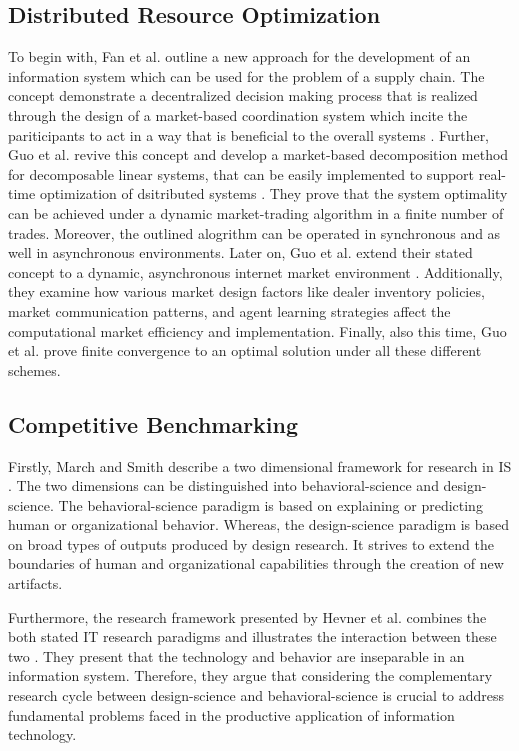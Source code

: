 \subsection{Distributed Resource Optimization}
\label{sec:Distributed Resource Optimization}
To begin with, Fan et al. outline a new approach for the development of an information system which can be used for the problem of a supply chain. The concept demonstrate a decentralized decision making process that is realized through the design of a market-based coordination system which incite the pariticipants to act in a way that is beneficial to the overall systems \cite{fan2003decentralized}. Further, Guo et al. revive this concept and develop a market-based decomposition method for decomposable linear systems, that can be easily implemented to support real-time optimization of dsitributed systems \cite{guo2007market}. They prove that the system optimality can be achieved under a dynamic market-trading algorithm in a finite number of trades. Moreover, the outlined alogrithm can be operated in synchronous and as well in asynchronous environments. Later on, Guo et al. extend their stated concept to a dynamic, asynchronous internet market environment \cite{guo2012computational}. Additionally, they examine how various market design factors like dealer inventory policies, market communication patterns, and agent learning strategies affect the computational market efficiency and implementation. Finally, also this time, Guo et al. prove finite convergence to an optimal solution under all these different schemes. 

\subsection{Competitive Benchmarking}
Firstly, March and Smith describe a two dimensional framework for research in IS \cite{march1995design}. The two dimensions can be distinguished into behavioral-science and design-science. The behavioral-science paradigm is based on explaining or predicting human or organizational behavior. Whereas, the design-science paradigm is based on broad types of outputs produced by design research. It strives to extend the boundaries of human and organizational capabilities through the creation of new artifacts. 

Furthermore, the research framework presented by Hevner et al. combines the both stated IT research paradigms and illustrates the interaction between these two \cite{hevner2008design}. They present that the technology and behavior are inseparable in an information system. Therefore, they argue that considering the complementary research cycle between design-science and behavioral-science is crucial to address fundamental problems faced in the productive application of information technology.        


